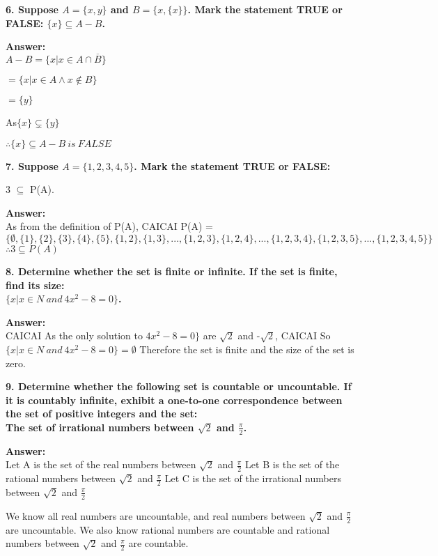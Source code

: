 \documentclass{article}
\begin{document}
\begin{large}
\textbf{6. Suppose $A=\{x,y\}$ and $B=\{x,\{x\}\}$. Mark the statement TRUE or FALSE: $\{x\}\subseteq A-B$.}

\textbf{Answer:} \\

$A-B = \{x|x \in A \cap \overline B\}$

    $= \{x|x \in A \land x \notin B\}$
    
   $ = \{y\}$

As$ \{x\} \subsetneq \{y\}$

$\therefore \{x\} \subseteq A-B\ is\ FALSE$


\textbf{7. Suppose $A=\{1,2,3,4,5\}$. Mark the statement TRUE or FALSE:}

{{3}} $\subseteq$ P(A).

\textbf{Answer:} \\

As from the definition of P(A), 
        CAICAI
P(A) = $\{\emptyset, \{1\}, \{2\}, \{3\}, \{4\}, \{5\}, \{1,2\}, \{1,3\}, ..., \{1,2,3\}, \{1,2,4\}, ..., \{1,2,3,4\}, \{1,2,3,5\}, ...,\{1,2,3,4,5\}\}$
$\therefore {{3}} \subseteq P(A)$


\textbf{8. Determine whether the set is finite or infinite. If the set is finite, find its size:\\
\indent$\{x|x\in N\ and\ 4{x^{2}}-8=0\}$.}

\textbf{Answer:} \\
                                              CAICAI
As the only solution to $4{x^{2}}-8=0\}$ are $\sqrt 2$ and -$\sqrt 2$, 
                                       CAICAI
So $\{x|x\in N\ and\ 4{x^{2}}-8=0\} = \emptyset $
Therefore the set is finite and the size of the set is zero.


\textbf{9. Determine whether the following set is countable or uncountable. If it is countably infinite, exhibit a one-to-one correspondence between the set of positive integers and the set:\\
The set of irrational numbers between $\sqrt{2}$ and $\frac{\pi}{2}$.}

\textbf{Answer:} \\

Let A is the set of the real numbers between $\sqrt{2}$ and $\frac{\pi}{2}$
Let B is the set of the rational numbers between $\sqrt{2}$ and $\frac{\pi}{2}$
Let C is the set of the irrational numbers between $\sqrt{2}$ and $\frac{\pi}{2}$

We know all real numbers are uncountable, and real numbers between $\sqrt{2}$ and $\frac{\pi}{2}$ are uncountable.
We also know rational numbers are countable and rational numbers between $\sqrt{2}$ and $\frac{\pi}{2}$ are countable.


\end{large}
\end{document}
